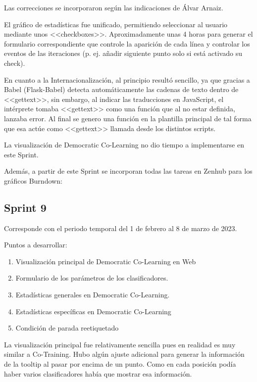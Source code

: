Las correcciones se incorporaron según las indicaciones de Álvar Arnaiz.

El gráfico de estadísticas fue unificado, permitiendo seleccionar al usuario
mediante unos <<checkboxes>>. Aproximadamente unas 4 horas para generar el
formulario correspondiente que controle la aparición de cada línea y controlar
los eventos de las iteraciones (p. ej. añadir siguiente punto solo si está
activado su check).

En cuanto a la Internacionalización, al principio resultó sencillo, ya que
gracias a Babel (Flask-Babel) detecta automáticamente las cadenas de texto
dentro de <<gettext>>, sin embargo, al indicar las traducciones en JavaScript,
el intérprete tomaba <<gettext>> como una función que al no estar definida,
lanzaba error. Al final se genero una función en la plantilla principal de tal
forma que esa actúe como <<gettext>> llamada desde los distintos scripts.

La visualización de Democratic Co-Learning no dio tiempo a implementarse en este Sprint.

Además, a partir de este Sprint se incorporan todas las tareas en Zenhub para los
gráficos Burndown:



\subsection{Sprint 9}
Corresponde con el periodo temporal del 1 de febrero al 8 de marzo de 2023.

Puntos a desarrollar:
\begin{enumerate}
    \item Visualización principal de Democratic Co-Learning en Web
    \item Formulario de los parámetros de los clasificadores.
    \item Estadísticas generales en Democratic Co-Learning.
    \item Estadísticas específicas en Democratic Co-Learning
    \item Condición de parada reetiquetado
\end{enumerate}

La visualización principal fue relativamente sencilla pues en realidad es muy
similar a Co-Training. Hubo algún ajuste adicional para generar la información
de la tooltip al pasar por encima de un punto. Como en cada posición podía haber
varios clasificadores había que mostrar esa información.

